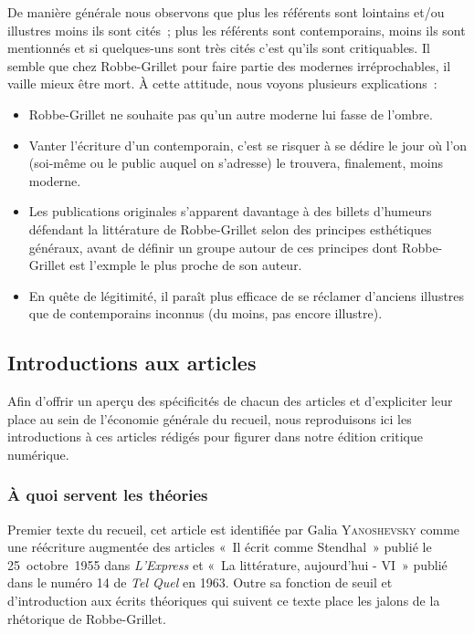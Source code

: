 \documentclass[12pt, a4paper]{article}
\begin{document}
De manière générale nous observons que plus les référents sont lointains et/ou illustres moins ils sont cités~; plus les référents sont contemporains, moins ils sont mentionnés et si quelques-uns sont très cités c'est qu'ils sont critiquables. Il semble que chez Robbe-Grillet pour faire partie des modernes irréprochables, il vaille mieux être mort. À cette attitude, nous voyons plusieurs explications~:
\begin{itemize}
    \item Robbe-Grillet ne souhaite pas qu'un autre moderne lui fasse de l'ombre.
    \item Vanter l'écriture d'un contemporain, c'est se risquer à se dédire le jour où l'on (soi-même ou le public auquel on s'adresse) le trouvera, finalement, moins moderne.
    \item Les publications originales s'apparent davantage à des billets d'humeurs défendant la littérature de Robbe-Grillet selon des principes esthétiques généraux, avant de définir un groupe autour de ces principes dont Robbe-Grillet est l'exmple le plus proche de son auteur.
    \item En quête de légitimité, il paraît plus efficace de se réclamer d'anciens illustres que de contemporains inconnus (du moins, pas encore illustre).
\end{itemize}




\subsection{Introductions aux articles}

Afin d'offrir un aperçu des spécificités de chacun des articles et d'expliciter leur place au sein de l'économie générale du recueil, nous reproduisons ici les introductions à ces articles rédigés pour figurer dans notre édition critique numérique.
\subsubsection{À quoi servent les théories}
Premier texte du recueil, cet article est identifiée par Galia \textsc{Yanoshevsky} comme une réécriture augmentée des articles «~Il écrit comme Stendhal~» publié le 25~octobre~1955 dans \textit{L'Express} et «~La littérature, aujourd'hui - VI~» publié dans le numéro 14 de \textit{Tel Quel} en 1963. Outre sa fonction de seuil et d'introduction aux écrits théoriques qui suivent ce texte place les jalons de la rhétorique de Robbe-Grillet.
\end{document}
